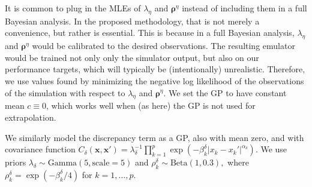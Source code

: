 \documentclass{article}
\begin{document}
It is common to plug in the MLEs of $\lambda_\eta$ and $\boldsymbol \rho^\eta$ instead of including them in a full Bayesian analysis.
%
In the proposed methodology, that is not merely a convenience, but rather is essential.
%
This is because in a full Bayesian analysis, $\lambda_\eta$ and $\boldsymbol\rho^\eta$ would be calibrated to the desired observations.
%
The resulting emulator would be trained not only only the simulator output, but also on our performance targets, which will typically be (intentionally) unrealistic.
%
Therefore, we use values found by minimizing the negative log likelihood of the observations of the simulation with respect to $\lambda_\eta$ and $\boldsymbol\rho^\eta$.
%
We set the GP to have constant mean $c\equiv0$, which works well when (as here) the GP is not used for extrapolation.

We similarly model the discrepancy term as a GP, also with mean zero, and with covariance function
%
$C_\delta(\mathbf x,\mathbf x') = \lambda_\delta^{-1} \prod_{k=1}^p
\exp\left( -\beta_k^\delta |x_k-x_k'|^{\alpha_\delta} \right).$
%
We use priors
%
$\lambda_\delta \sim \mathrm{Gamma}(5,\mathrm{scale}=5)$ and $\rho^\delta_k \sim \mathrm{Beta}(1,0.3),$
%
where $\rho_k^\delta = \exp(-\beta_k^\delta/4)$ for $k=1,\ldots,p$.
\end{document}
